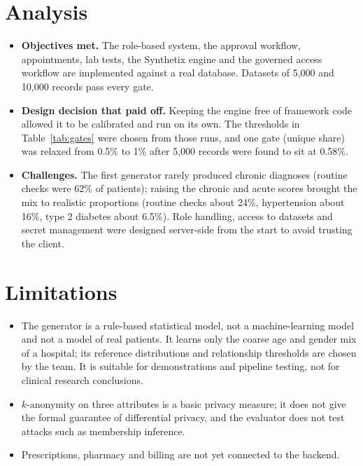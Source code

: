 \documentclass{tietreport}
\begin{document}
\section{Analysis}

\begin{itemize}
  \item \textbf{Objectives met.} The role-based system, the approval
    workflow, appointments, lab tests, the Synthetix engine and the governed
    access workflow are implemented against a real database. Datasets of
    5,000 and 10,000 records pass every gate.
  \item \textbf{Design decision that paid off.} Keeping the engine free of
    framework code allowed it to be calibrated and run on its own. The
    thresholds in Table~\ref{tab:gates} were chosen from those runs, and one
    gate (unique share) was relaxed from 0.5\% to 1\% after 5,000 records
    were found to sit at 0.58\%.
  \item \textbf{Challenges.} The first generator rarely produced chronic
    diagnoses (routine checks were 62\% of patients); raising the chronic
    and acute scores brought the mix to realistic proportions (routine checks
    about 24\%, hypertension about 16\%, type 2 diabetes about 6.5\%).
    Role handling, access to datasets and secret management were designed
    server-side from the start to avoid trusting the client.
\end{itemize}

\section{Limitations}

\begin{itemize}
  \item The generator is a rule-based statistical model, not a machine-learning
    model and not a model of real patients. It learns only the coarse age and
    gender mix of a hospital; its reference distributions and relationship
    thresholds are chosen by the team. It is suitable for demonstrations and
    pipeline testing, not for clinical research conclusions.
  \item $k$-anonymity on three attributes is a basic privacy measure; it does
    not give the formal guarantee of differential privacy, and the evaluator
    does not test attacks such as membership inference.
  \item Prescriptions, pharmacy and billing are not yet connected to the
    backend.
\end{itemize}
\end{document}
